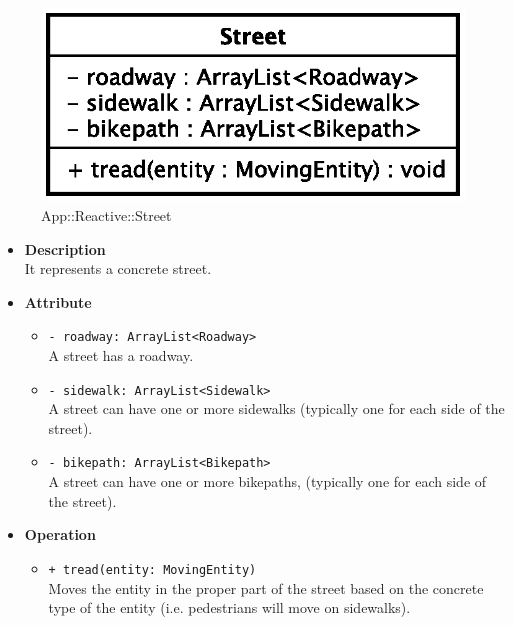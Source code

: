 \begin{figure}[h]
\centering
\includegraphics[scale=0.6,keepaspectratio]{images/solution/street.eps}
\caption{App::Reactive::Street}
\label{fig:sd-app-street}
\end{figure}
\FloatBarrier
\begin{itemize}
  \item \textbf{Description} \\
    It represents a concrete street.
  \item \textbf{Attribute}
  \begin{itemize}
    \item \texttt{- roadway: ArrayList<Roadway>} \\
A street has a roadway.
    \item \texttt{- sidewalk: ArrayList<Sidewalk>} \\
A street can have one or more sidewalks (typically one for each side
of the street).
    \item \texttt{- bikepath: ArrayList<Bikepath>} \\
A street can have one or more bikepaths, (typically one for each side
of the street).
  \end{itemize}
  \item \textbf{Operation}
  \begin{itemize} 
    \item \texttt{+ tread(entity: MovingEntity)} \\
Moves the entity in the proper part of the street based on the
concrete type of the entity (i.e. pedestrians will move on sidewalks).
  \end{itemize}
\end{itemize}
